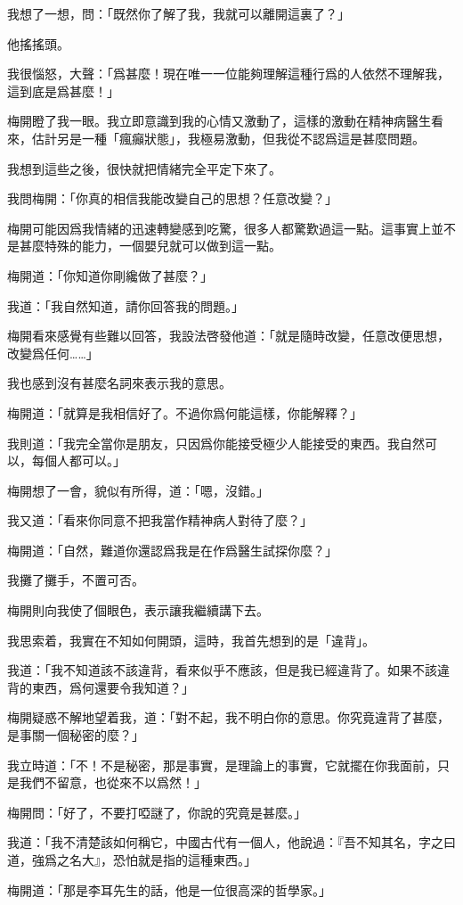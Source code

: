 我想了一想，問：「既然你了解了我，我就可以離開這裏了？」

他搖搖頭。

我很惱怒，大聲：「爲甚麼！現在唯一一位能夠理解這種行爲的人依然不理解我，這到底是爲甚麼！」

梅開瞪了我一眼。我立即意識到我的心情又激動了，這樣的激動在精神病醫生看來，估計另是一種「瘋癲狀態」，我極易激動，但我從不認爲這是甚麼問題。

我想到這些之後，很快就把情緒完全平定下來了。

我問梅開：「你真的相信我能改變自己的思想？任意改變？」

梅開可能因爲我情緒的迅速轉變感到吃驚，很多人都驚歎過這一點。這事實上並不是甚麼特殊的能力，一個嬰兒就可以做到這一點。

梅開道：「你知道你剛纔做了甚麼？」

我道：「我自然知道，請你回答我的問題。」

梅開看來感覺有些難以回答，我設法啓發他道：「就是隨時改變，任意改便思想，改變爲任何……」

我也感到沒有甚麼名詞來表示我的意思。

梅開道：「就算是我相信好了。不過你爲何能這樣，你能解釋？」

我則道：「我完全當你是朋友，只因爲你能接受極少人能接受的東西。我自然可以，每個人都可以。」

梅開想了一會，貌似有所得，道：「嗯，沒錯。」

我又道：「看來你同意不把我當作精神病人對待了麼？」

梅開道：「自然，難道你還認爲我是在作爲醫生試探你麼？」

我攤了攤手，不置可否。

梅開則向我使了個眼色，表示讓我繼續講下去。

我思索着，我實在不知如何開頭，這時，我首先想到的是「違背」。

我道：「我不知道該不該違背，看來似乎不應該，但是我已經違背了。如果不該違背的東西，爲何還要令我知道？」

梅開疑惑不解地望着我，道：「對不起，我不明白你的意思。你究竟違背了甚麼，是事關一個秘密的麼？」

我立時道：「不！不是秘密，那是事實，是理論上的事實，它就擺在你我面前，只是我們不留意，也從來不以爲然！」

梅開問：「好了，不要打啞謎了，你說的究竟是甚麼。」

我道：「我不清楚該如何稱它，中國古代有一個人，他說過：『吾不知其名，字之曰道，強爲之名大』，恐怕就是指的這種東西。」

梅開道：「那是李耳先生的話，他是一位很高深的哲學家。」

